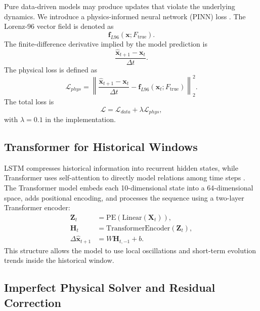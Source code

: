 \documentclass[a4paper,12pt]{article}
\newcommand{\xvec}{\mathbf{x}}
\newcommand{\dt}{\Delta t}
\begin{document}
Pure data-driven models may produce updates that violate the underlying dynamics. We introduce a physics-informed neural network (PINN) loss \cite{raissi2019}. The Lorenz-96 vector field is denoted as
\begin{equation}
\mathbf{f}_{L96}(\xvec;F_{\mathrm{true}}).
\end{equation}
The finite-difference derivative implied by the model prediction is
\begin{equation}
\frac{\hat{\xvec}_{t+1}-\xvec_t}{\dt}.
\end{equation}
The physical loss is defined as
\begin{equation}
\mathcal{L}_{phys}=
\left\|
\frac{\hat{\xvec}_{t+1}-\xvec_t}{\dt}
-
\mathbf{f}_{L96}(\xvec_t;F_{\mathrm{true}})
\right\|_2^2.
\end{equation}
The total loss is
\begin{equation}
\mathcal{L}=\mathcal{L}_{data}+\lambda \mathcal{L}_{phys},
\end{equation}
with $\lambda=0.1$ in the implementation.

\subsection{Transformer for Historical Windows}

LSTM compresses historical information into recurrent hidden states, while Transformer uses self-attention to directly model relations among time steps \cite{vaswani2017}. The Transformer model embeds each 10-dimensional state into a 64-dimensional space, adds positional encoding, and processes the sequence using a two-layer Transformer encoder:
\begin{align}
\mathbf{Z}_t &= \mathrm{PE}(\mathrm{Linear}(\mathbf{X}_t)),\\
\mathbf{H}_t &= \mathrm{TransformerEncoder}(\mathbf{Z}_t),\\
\Delta\hat{\xvec}_{t+1} &= W\mathbf{H}_{t,-1}+b.
\end{align}
This structure allows the model to use local oscillations and short-term evolution trends inside the historical window.

\subsection{Imperfect Physical Solver and Residual Correction}
\end{document}
